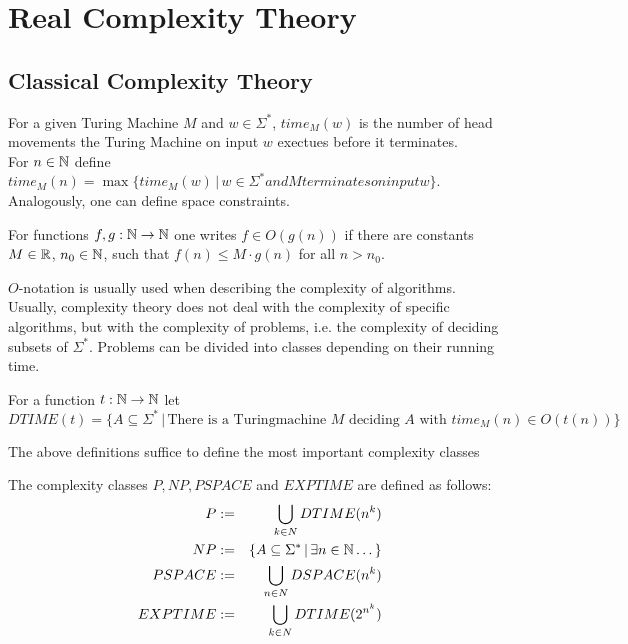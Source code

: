 \section{Real Complexity Theory}
	\subsection{Classical Complexity Theory}
		\begin{definition}
			For a given Turing Machine $M$ and $w \in \Sigma^*$, $time_M(w)$ is the number of head movements 
			the Turing Machine on input $w$ exectues before it terminates. \\
			For $n \in \mathbb N$ define $time_M(n) = \max \{ time_M(w) \,|\, w \in \Sigma^* and M terminates on input w \}$.\\
			Analogously, one can define space constraints.
		\end{definition}
		\begin{definition}
			For functions $f, g: \mathbb N \to \mathbb N$ one writes $f \in O(g(n))$ if there are constants $M \in \mathbb R$, $n_0 \in \mathbb N$, such that
			$ f(n) \leq M \cdot g(n)$ for all $n > n_0$. 
		\end{definition}
			$O$-notation is usually used when describing the complexity of algorithms. \\
			Usually, complexity theory does not deal with the complexity of specific algorithms, but with the complexity of problems, 
			i.e. the complexity of deciding subsets of $\Sigma^*$. Problems can be divided into classes depending on their running time.
		\begin{definition}
			For a function $t: \mathbb N \to \mathbb N$ let 
			$$ DTIME(t) = \{ A \subseteq \Sigma^* \,|\, \text{There is a Turingmachine } M \text{ deciding } A \text{ with } time_M(n) \in O(t(n)) \} $$
		\end{definition}
		The above definitions suffice to define the most important complexity classes
		\begin{definition}
			The complexity classes $P, NP, PSPACE$ and $EXPTIME$ are defined as follows:
			\begin{eqnarray*}
				P & := & \bigcup_{k \in N} DTIME(n^k) \\
				NP & := & \{A \subseteq \Sigma^* \,|\, \exists n \in \mathbb N  \dots \} \\
				PSPACE & := & \bigcup_{n \in N} DSPACE(n^k) \\
				EXPTIME & := & \bigcup_{k \in N} DTIME(2^{n^k}) \\
			\end{eqnarray*}
		\end{definition}
